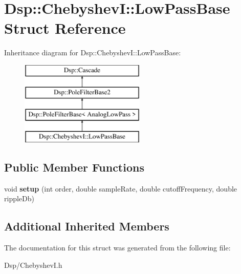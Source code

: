 \hypertarget{structDsp_1_1ChebyshevI_1_1LowPassBase}{\section{Dsp\-:\-:Chebyshev\-I\-:\-:Low\-Pass\-Base Struct Reference}
\label{structDsp_1_1ChebyshevI_1_1LowPassBase}
}
Inheritance diagram for Dsp\-:\-:Chebyshev\-I\-:\-:Low\-Pass\-Base\-:\begin{figure}[H]
\begin{center}
\leavevmode
\includegraphics[height=4.000000cm]{structDsp_1_1ChebyshevI_1_1LowPassBase}
\end{center}
\end{figure}
\subsection*{Public Member Functions}
\begin{DoxyCompactItemize}
\item 
\hypertarget{structDsp_1_1ChebyshevI_1_1LowPassBase_a0ce05eb4662ae3f07792c2fad63276fd}{void {\bfseries setup} (int order, double sample\-Rate, double cutoff\-Frequency, double ripple\-Db)}\label{structDsp_1_1ChebyshevI_1_1LowPassBase_a0ce05eb4662ae3f07792c2fad63276fd}

\end{DoxyCompactItemize}
\subsection*{Additional Inherited Members}


The documentation for this struct was generated from the following file\-:\begin{DoxyCompactItemize}
\item 
Dsp/Chebyshev\-I.\-h\end{DoxyCompactItemize}
